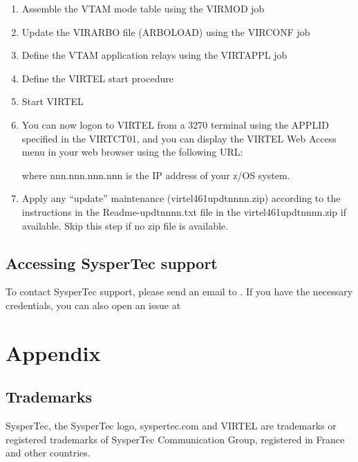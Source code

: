 \documentclass[letterpaper,10pt,english]{sphinxmanual}
\begin{document}
\begin{enumerate}
\begin{enumerate}
\end{enumerate}

\item {} 
Assemble the VTAM mode table using the VIRMOD job

\item {} 
Update the VIRARBO file (ARBOLOAD) using the VIRCONF job

\item {} 
Define the VTAM application relays using the VIRTAPPL job

\item {} 
Define the VIRTEL start procedure

\item {} 
Start VIRTEL

\item {} 
You can now logon to VIRTEL from a 3270 terminal using the APPLID specified in the VIRTCT01, and you can display the VIRTEL Web Access menu in your web browser using the following URL:
\begin{quote}

\end{quote}

where nnn.nnn.nnn.nnn is the IP address of your z/OS system.

\item {} 
Apply any “update” maintenance (virtel461updtnnnn.zip) according to the instructions in the Readme-updtnnnn.txt file in the virtel461updtnnnn.zip if available. Skip this step if no zip file is available.

\end{enumerate}


\section{Accessing SysperTec support}
\label{\detokenize{Getting_Started:accessing-syspertec-support}}
To contact SysperTec support, please send an email to . If you have the necessary credentials, you can also open an issue at 


\chapter{Appendix}
\label{\detokenize{Getting_Started:appendix}}

\section{Trademarks}
\label{\detokenize{Getting_Started:trademarks}}
SysperTec, the SysperTec logo, syspertec.com and VIRTEL are trademarks or registered trademarks of SysperTec
Communication Group, registered in France and other countries.
\end{document}

